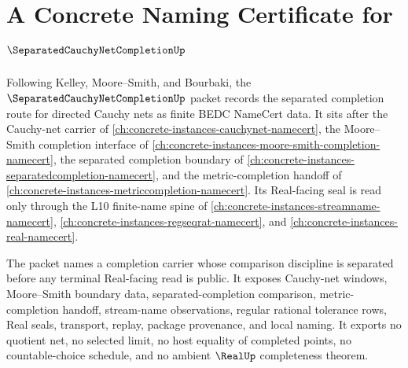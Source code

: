 \chapter{A Concrete Naming Certificate for $\SeparatedCauchyNetCompletionUp$}
\label{ch:concrete-instances-separated-cauchy-net-completion-namecert}

Following Kelley, Moore--Smith, and Bourbaki, the $\SeparatedCauchyNetCompletionUp$ packet records the separated completion route for directed Cauchy nets as finite BEDC NameCert data. It sits after the Cauchy-net carrier of \autoref{ch:concrete-instances-cauchynet-namecert}, the Moore--Smith completion interface of \autoref{ch:concrete-instances-moore-smith-completion-namecert}, the separated completion boundary of \autoref{ch:concrete-instances-separatedcompletion-namecert}, and the metric-completion handoff of \autoref{ch:concrete-instances-metriccompletion-namecert}. Its Real-facing seal is read only through the L10 finite-name spine of \autoref{ch:concrete-instances-streamname-namecert}, \autoref{ch:concrete-instances-regseqrat-namecert}, and \autoref{ch:concrete-instances-real-namecert}.

The packet names a completion carrier whose comparison discipline is separated before any terminal Real-facing read is public. It exposes Cauchy-net windows, Moore--Smith boundary data, separated-completion comparison, metric-completion handoff, stream-name observations, regular rational tolerance rows, Real seals, transport, replay, package provenance, and local naming. It exports no quotient net, no selected limit, no host equality of completed points, no countable-choice schedule, and no ambient $\RealUp$ completeness theorem.

